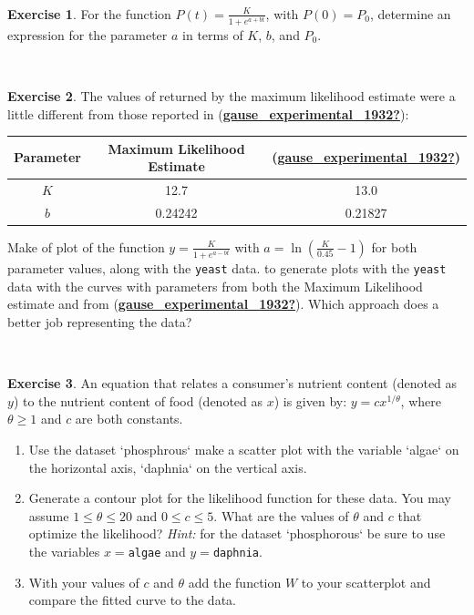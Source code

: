 \documentclass[
]{book}
\theoremstyle{definition}
\theoremstyle{definition}
\theoremstyle{definition}
\newtheorem{exercise}{Exercise}[chapter]
\theoremstyle{remark}
\begin{document}
~

\begin{exercise}
\protect\hypertarget{exr:unnamed-chunk-170}{}{\label{exr:unnamed-chunk-170} }For the function \(\displaystyle P(t)=\frac{K}{1+e^{a+bt}}\), with \(P(0)=P_{0}\), determine an expression for the parameter \(a\) in terms of \(K\), \(b\), and \(P_{0}\).
\end{exercise}

~

\begin{exercise}
\protect\hypertarget{exr:unnamed-chunk-171}{}{\label{exr:unnamed-chunk-171} }The values of returned by the maximum likelihood estimate were a little different from those reported in (\protect\hyperlink{ref-gause_experimental_1932}{\textbf{gause\_experimental\_1932?}}):

\begin{longtable}[]{@{}ccc@{}}
\toprule
\textbf{Parameter} & \textbf{Maximum Likelihood Estimate} & \textbf{(\protect\hyperlink{ref-gause_experimental_1932}{\textbf{gause\_experimental\_1932?}})} \\
\midrule
\endhead
\(K\) & 12.7 & 13.0 \\
\(b\) & 0.24242 & 0.21827 \\
\bottomrule
\end{longtable}

Make of plot of the function \(\displaystyle y = \frac{K}{1+e^{a-bt}}\) with \(\displaystyle a = \ln \left( \frac{K}{0.45} - 1 \right)\) for both parameter values, along with the \texttt{yeast} data. to generate plots with the \texttt{yeast} data with the curves with parameters from both the Maximum Likelihood estimate and from (\protect\hyperlink{ref-gause_experimental_1932}{\textbf{gause\_experimental\_1932?}}). Which approach does a better job representing the data?
\end{exercise}

~

\begin{exercise}
\protect\hypertarget{exr:unnamed-chunk-172}{}{\label{exr:unnamed-chunk-172} }An equation that relates a consumer's nutrient content (denoted as \(y\)) to the nutrient content of food (denoted as \(x\)) is given by: \(\displaystyle y = c x^{1/\theta}\), where \(\theta \geq 1\) and \(c\) are both constants.

\begin{enumerate}[label=\alph*.]
\item Use the dataset `phosphrous` make a scatter plot with the variable `algae` on the horizontal axis, `daphnia` on the vertical axis.
\item Generate a contour plot for the likelihood function for these data. You may assume $1 \leq \theta \leq 20$ and $0 \leq c \leq 5$.  What are the values of $\theta$ and $c$ that optimize the likelihood? \emph{Hint:} for the dataset `phosphorous` be sure to use the variables $x=$\texttt{algae} and $y=$\texttt{daphnia}.
\item With your values of $c$ and $\theta$ add the function $W$ to your scatterplot and compare the fitted curve to the data.
\end{enumerate}
\end{exercise}
\end{document}
